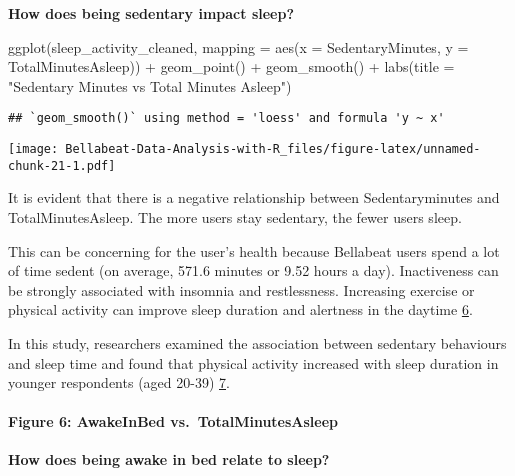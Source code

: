 \documentclass[
]{article}
\newenvironment{Shaded}{\begin{snugshade}}{\end{snugshade}}
\newcommand{\AttributeTok}[1]{\textcolor[rgb]{0.77,0.63,0.00}{#1}}
\newcommand{\FunctionTok}[1]{\textcolor[rgb]{0.00,0.00,0.00}{#1}}
\newcommand{\NormalTok}[1]{#1}
\newcommand{\SpecialCharTok}[1]{\textcolor[rgb]{0.00,0.00,0.00}{#1}}
\newcommand{\StringTok}[1]{\textcolor[rgb]{0.31,0.60,0.02}{#1}}
\begin{document}
\textbf{How does being sedentary impact sleep?}

\begin{Shaded}
\begin{Highlighting}[]
\FunctionTok{ggplot}\NormalTok{(sleep\_activity\_cleaned, }\AttributeTok{mapping =} \FunctionTok{aes}\NormalTok{(}\AttributeTok{x =}\NormalTok{ SedentaryMinutes, }\AttributeTok{y =}\NormalTok{ TotalMinutesAsleep)) }\SpecialCharTok{+} \FunctionTok{geom\_point}\NormalTok{() }\SpecialCharTok{+} \FunctionTok{geom\_smooth}\NormalTok{() }\SpecialCharTok{+} \FunctionTok{labs}\NormalTok{(}\AttributeTok{title =} \StringTok{"Sedentary Minutes vs Total Minutes Asleep"}\NormalTok{) }
\end{Highlighting}
\end{Shaded}

\begin{verbatim}
## `geom_smooth()` using method = 'loess' and formula 'y ~ x'
\end{verbatim}

\texttt{[image: Bellabeat-Data-Analysis-with-R\_files/figure-latex/unnamed-chunk-21-1.pdf]}

It is evident that there is a negative relationship between
Sedentaryminutes and TotalMinutesAsleep. The more users stay sedentary,
the fewer users sleep.

This can be concerning for the user's health because Bellabeat users
spend a lot of time sedent (on average, 571.6 minutes or 9.52 hours a
day). Inactiveness can be strongly associated with insomnia and
restlessness. Increasing exercise or physical activity can improve sleep
duration and alertness in the daytime
\href{https://www.ncbi.nlm.nih.gov/pmc/articles/PMC6352043/}{6}.

In this study, researchers examined the association between sedentary
behaviours and sleep time and found that physical activity increased
with sleep duration in younger respondents (aged 20-39)
\href{https://www.sciencedirect.com/science/article/abs/pii/S0091743514002035\%20→\%20physical\%20activity\%20and\%20sleep\%20duration}{7}.

\hypertarget{figure-6-awakeinbed-vs.-totalminutesasleep}{%
\paragraph{Figure 6: AwakeInBed
vs.~TotalMinutesAsleep}\label{figure-6-awakeinbed-vs.-totalminutesasleep}}

\textbf{How does being awake in bed relate to sleep?}
\end{document}
